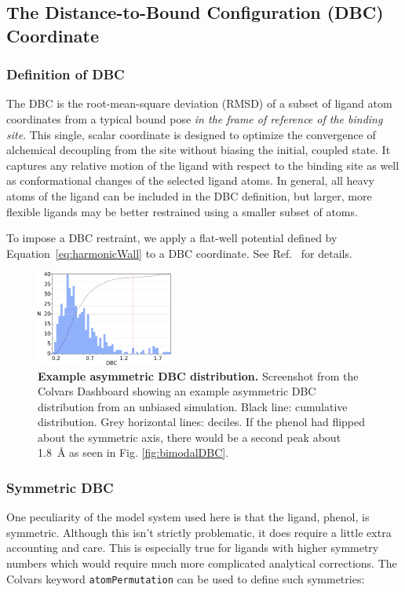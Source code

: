 \documentclass[9pt,tutorial]{Styling/livecoms}
\begin{document}
\subsection{The Distance-to-Bound Configuration (DBC) Coordinate}
\subsubsection{Definition of DBC}
The DBC is the root-mean-square deviation (RMSD) of a subset of ligand atom coordinates from a typical bound pose \textit{in the frame of reference of the binding site}.
This single, scalar coordinate is designed to optimize the convergence of alchemical decoupling from the site without biasing the initial, coupled state.
It captures any relative motion of the ligand with respect to the binding site as well as conformational changes of the selected ligand atoms.
In general, all heavy atoms of the ligand can be included in the DBC definition, but larger, more flexible ligands may be better restrained using a smaller subset of atoms.

To impose a DBC restraint, we apply a flat-well potential defined by Equation~\ref{eq:harmonicWall} to a DBC coordinate.
See Ref.~ for details.
\begin{figure}[!htb]
    \centering
\includegraphics[width=0.4\textwidth]{histogram.png} 
    \caption{\textbf{Example asymmetric DBC distribution.} Screenshot from the Colvars Dashboard showing an example asymmetric DBC distribution from an unbiased simulation. Black line: cumulative distribution. Grey horizontal lines: deciles. If the phenol had flipped about the symmetric axis, there would be a second peak about 1.8~\AA{} as seen in Fig. \ref{fig:bimodalDBC}.}
\label{step:DBCwidth}
\end{figure}


\subsubsection{Symmetric DBC}
\label{app:Symmetry}

One peculiarity of the model system used here is that the ligand, phenol, is symmetric. 
Although this isn't strictly problematic, it does require a little extra accounting and care. 
This is especially true for ligands with higher symmetry numbers which would require much more complicated analytical corrections. 
The Colvars keyword \texttt{atomPermutation} can be used to define such symmetries:
\end{document}

